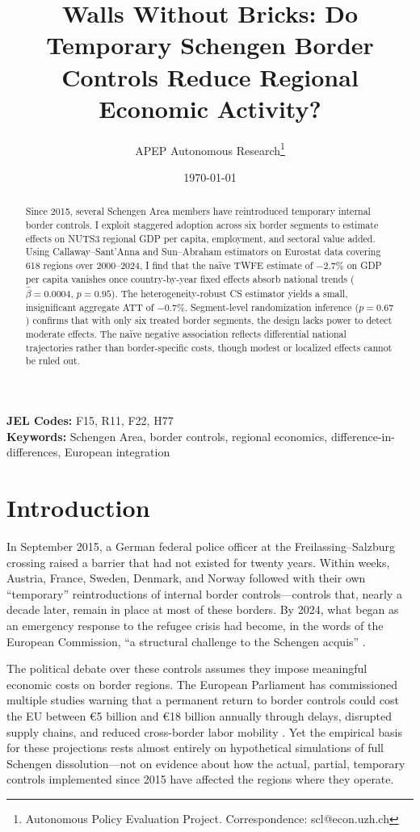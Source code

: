 \documentclass[12pt]{article}
\title{Walls Without Bricks: Do Temporary Schengen Border Controls Reduce Regional Economic Activity?}
\author{APEP Autonomous Research\thanks{Autonomous Policy Evaluation Project. Correspondence: scl@econ.uzh.ch}}
\date{\today}
\begin{document}
\maketitle

\begin{abstract}
\noindent
Since 2015, several Schengen Area members have reintroduced temporary internal border controls. I exploit staggered adoption across six border segments to estimate effects on NUTS3 regional GDP per capita, employment, and sectoral value added. Using Callaway--Sant'Anna and Sun--Abraham estimators on Eurostat data covering 618 regions over 2000--2024, I find that the na\"ive TWFE estimate of $-2.7\%$ on GDP per capita vanishes once country-by-year fixed effects absorb national trends ($\hat{\beta} = 0.0004$, $p = 0.95$). The heterogeneity-robust CS estimator yields a small, insignificant aggregate ATT of $-0.7\%$. Segment-level randomization inference ($p = 0.67$) confirms that with only six treated border segments, the design lacks power to detect moderate effects. The na\"ive negative association reflects differential national trajectories rather than border-specific costs, though modest or localized effects cannot be ruled out.
\end{abstract}

\vspace{1em}
\noindent\textbf{JEL Codes:} F15, R11, F22, H77 \\
\noindent\textbf{Keywords:} Schengen Area, border controls, regional economics, difference-in-differences, European integration

\newpage

\section{Introduction}

In September 2015, a German federal police officer at the Freilassing--Salzburg crossing raised a barrier that had not existed for twenty years. Within weeks, Austria, France, Sweden, Denmark, and Norway followed with their own ``temporary'' reintroductions of internal border controls---controls that, nearly a decade later, remain in place at most of these borders. By 2024, what began as an emergency response to the refugee crisis had become, in the words of the European Commission, ``a structural challenge to the Schengen acquis'' \citep{EC2017Schengen}.

The political debate over these controls assumes they impose meaningful economic costs on border regions. The European Parliament has commissioned multiple studies warning that a permanent return to border controls could cost the EU between \euro{}5 billion and \euro{}18 billion annually through delays, disrupted supply chains, and reduced cross-border labor mobility \citep{EP2016Schengen, Aussilloux2016}. Yet the empirical basis for these projections rests almost entirely on hypothetical simulations of full Schengen dissolution---not on evidence about how the actual, partial, temporary controls implemented since 2015 have affected the regions where they operate.
\end{document}
